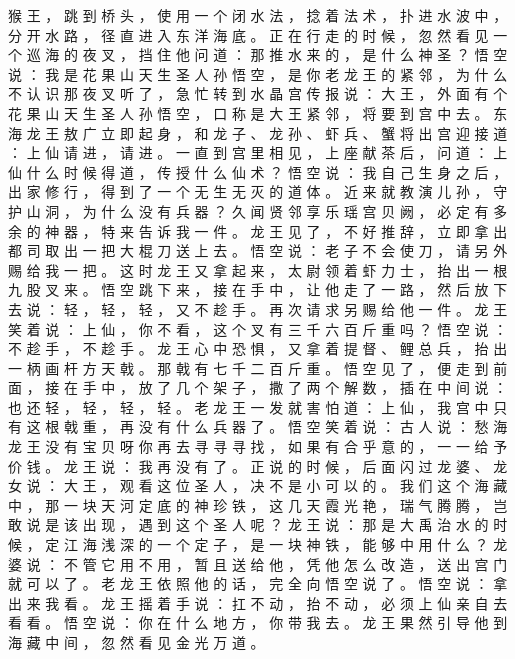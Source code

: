 {猴 王 ， 跳 到 桥 头 ， 使 用 一 个 闭 水 法 ， 捻 着 法 术 ， 扑 进 水 波 中 ， 分 开 水 路 ， 径 直 进 入 东 洋 海 底 。
正 在 行 走 的 时 候 ， 忽 然 看 见 一 个 巡 海 的 夜 叉 ， 挡 住 他 问 道 ： 那 推 水 来 的 ， 是 什 么 神 圣 ？
悟 空 说 ： 我 是 花 果 山 天 生 圣 人 孙 悟 空 ， 是 你 老 龙 王 的 紧 邻 ， 为 什 么 不 认 识 那 夜 叉 听 了 ， 急 忙 转 到 水 晶 宫 传 报 说 ： 大 王 ， 外 面 有 个 花 果 山 天 生 圣 人 孙 悟 空 ， 口 称 是 大 王 紧 邻 ， 将 要 到 宫 中 去 。
东 海 龙 王 敖 广 立 即 起 身 ， 和 龙 子 、 龙 孙 、 虾 兵 、 蟹 将 出 宫 迎 接 道 ： 上 仙 请 进 ， 请 进 。
一 直 到 宫 里 相 见 ， 上 座 献 茶 后 ， 问 道 ： 上 仙 什 么 时 候 得 道 ， 传 授 什 么 仙 术 ？ 悟 空 说 ： 我 自 己 生 身 之 后 ， 出 家 修 行 ， 得 到 了 一 个 无 生 无 灭 的 道 体 。
近 来 就 教 演 儿 孙 ， 守 护 山 洞 ， 为 什 么 没 有 兵 器 ？
久 闻 贤 邻 享 乐 瑶 宫 贝 阙 ， 必 定 有 多 余 的 神 器 ， 特 来 告 诉 我 一 件 。
龙 王 见 了 ， 不 好 推 辞 ， 立 即 拿 出 都 司 取 出 一 把 大 棍 刀 送 上 去 。
悟 空 说 ： 老 子 不 会 使 刀 ， 请 另 外 赐 给 我 一 把 。
这 时 龙 王 又 拿 起 来 ， 太 尉 领 着 虾 力 士 ， 抬 出 一 根 九 股 叉 来 。
悟 空 跳 下 来 ， 接 在 手 中 ， 让 他 走 了 一 路 ， 然 后 放 下 去 说 ： 轻 ， 轻 ， 轻 ， 又 不 趁 手 。
再 次 请 求 另 赐 给 他 一 件 。
龙 王 笑 着 说 ： 上 仙 ， 你 不 看 ， 这 个 叉 有 三 千 六 百 斤 重 吗 ？
悟 空 说 ： 不 趁 手 ， 不 趁 手 。
龙 王 心 中 恐 惧 ， 又 拿 着 提 督 、 鲤 总 兵 ， 抬 出 一 柄 画 杆 方 天 戟 。
那 戟 有 七 千 二 百 斤 重 。
悟 空 见 了 ， 便 走 到 前 面 ， 接 在 手 中 ， 放 了 几 个 架 子 ， 撒 了 两 个 解 数 ， 插 在 中 间 说 ： 也 还 轻 ， 轻 ， 轻 ， 轻 。
老 龙 王 一 发 就 害 怕 道 ： 上 仙 ， 我 宫 中 只 有 这 根 戟 重 ， 再 没 有 什 么 兵 器 了 。
悟 空 笑 着 说 ： 古 人 说 ： 愁 海 龙 王 没 有 宝 贝 呀 你 再 去 寻 寻 寻 找 ， 如 果 有 合 乎 意 的 ， 一 一 给 予 价 钱 。
龙 王 说 ： 我 再 没 有 了 。
正 说 的 时 候 ， 后 面 闪 过 龙 婆 、 龙 女 说 ： 大 王 ， 观 看 这 位 圣 人 ， 决 不 是 小 可 以 的 。
我 们 这 个 海 藏 中 ， 那 一 块 天 河 定 底 的 神 珍 铁 ， 这 几 天 霞 光 艳 ， 瑞 气 腾 腾 ， 岂 敢 说 是 该 出 现 ， 遇 到 这 个 圣 人 呢 ？ 龙 王 说 ： 那 是 大 禹 治 水 的 时 候 ， 定 江 海 浅 深 的 一 个 定 子 ， 是 一 块 神 铁 ， 能 够 中 用 什 么 ？ 龙 婆 说 ： 不 管 它 用 不 用 ， 暂 且 送 给 他 ， 凭 他 怎 么 改 造 ， 送 出 宫 门 就 可 以 了 。
老 龙 王 依 照 他 的 话 ， 完 全 向 悟 空 说 了 。
悟 空 说 ： 拿 出 来 我 看 。
龙 王 摇 着 手 说 ： 扛 不 动 ， 抬 不 动 ， 必 须 上 仙 亲 自 去 看 看 。
悟 空 说 ： 你 在 什 么 地 方 ， 你 带 我 去 。
龙 王 果 然 引 导 他 到 海 藏 中 间 ， 忽 然 看 见 金 光 万 道 。
}
